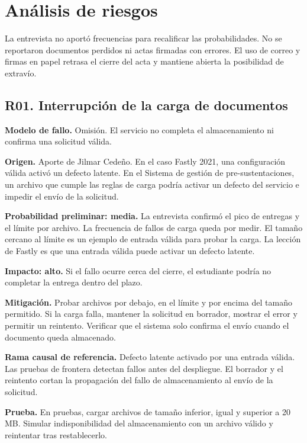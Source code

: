 \section{Análisis de riesgos}

La entrevista no aportó frecuencias para recalificar las probabilidades. No se reportaron documentos perdidos ni actas firmadas con errores. El uso de correo y firmas en papel retrasa el cierre del acta y mantiene abierta la posibilidad de extravío.

\subsection{R01. Interrupción de la carga de documentos}

\textbf{Modelo de fallo.} Omisión. El servicio no completa el almacenamiento ni confirma una solicitud válida.

\textbf{Origen.} Aporte de Jilmar Cedeño. En el caso Fastly 2021, una configuración válida activó un defecto latente. En el Sistema de gestión de pre-sustentaciones, un archivo que cumple las reglas de carga podría activar un defecto del servicio e impedir el envío de la solicitud.

\textbf{Probabilidad preliminar: media.} La entrevista confirmó el pico de entregas y el límite por archivo. La frecuencia de fallos de carga queda por medir. El tamaño cercano al límite es un ejemplo de entrada válida para probar la carga. La lección de Fastly es que una entrada válida puede activar un defecto latente.

\textbf{Impacto: alto.} Si el fallo ocurre cerca del cierre, el estudiante podría no completar la entrega dentro del plazo.

\textbf{Mitigación.} Probar archivos por debajo, en el límite y por encima del tamaño permitido. Si la carga falla, mantener la solicitud en borrador, mostrar el error y permitir un reintento. Verificar que el sistema solo confirma el envío cuando el documento queda almacenado.

\textbf{Rama causal de referencia.} Defecto latente activado por una entrada válida. Las pruebas de frontera detectan fallos antes del despliegue. El borrador y el reintento cortan la propagación del fallo de almacenamiento al envío de la solicitud.

\textbf{Prueba.} En pruebas, cargar archivos de tamaño inferior, igual y superior a 20 MB. Simular indisponibilidad del almacenamiento con un archivo válido y reintentar tras restablecerlo.

